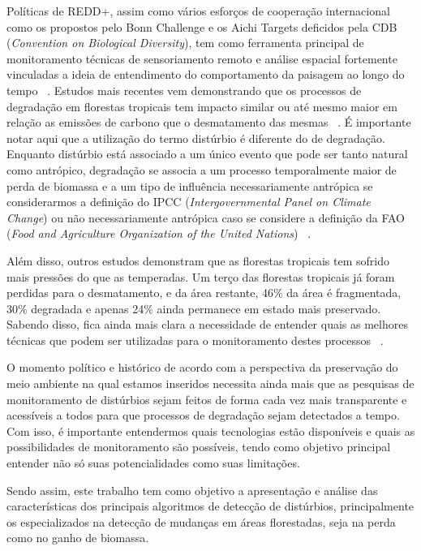 \documentclass{article}
\begin{document}
Políticas de REDD+, assim como vários esforços de cooperação internacional como os propostos pelo Bonn Challenge e os Aichi Targets deficidos pela CDB (\textit{Convention on Biological Diversity}), tem como ferramenta principal de monitoramento técnicas de sensoriamento remoto e análise espacial fortemente vinculadas a ideia de entendimento do comportamento da paisagem ao longo do tempo ~\cite{BOS2019295, CROUZEILLES2019}. Estudos mais recentes vem demonstrando que os processos de degradação em florestas tropicais tem impacto similar ou até mesmo maior em relação as emissões de carbono que o desmatamento das mesmas ~\cite{Harris1573, Houghton2012, Grace2014}. É importante notar aqui que a utilização do termo distúrbio é diferente do de degradação. Enquanto distúrbio está associado a um único evento que pode ser tanto natural como antrópico, degradação se associa a um processo temporalmente maior de perda de biomassa e a um tipo de influência necessariamente antrópica se considerarmos a definição do IPCC (\textit{Intergovernmental Panel on Climate Change}) ou não necessariamente antrópica caso se considere a definição da FAO (\textit{Food and Agriculture Organization of the United Nations}) ~\cite{Hirschmugl2017}. 
\par
Além disso, outros estudos demonstram que as florestas tropicais tem sofrido mais pressões do que as temperadas. Um terço das florestas tropicais já foram perdidas para o desmatamento, e da área restante, 46\% da área é fragmentada, 30\% degradada e apenas 24\% ainda permanece em estado mais preservado. Sabendo disso, fica ainda mais clara a necessidade de entender quais as melhores técnicas que podem ser utilizadas para o monitoramento destes processos ~\cite{Hirschmugl2017}. 
\par
O momento político e histórico de acordo com a perspectiva da preservação do meio ambiente na qual estamos inseridos necessita ainda mais que as pesquisas de monitoramento de distúrbios sejam feitos de forma cada vez mais transparente e acessíveis a todos para que processos de degradação sejam detectados a tempo. Com isso, é importante entendermos quais tecnologias estão disponíveis e quais as possibilidades de monitoramento são possíveis, tendo como objetivo principal entender não só suas potencialidades como suas limitações. 
\par
Sendo assim, este trabalho tem como objetivo a apresentação e análise das características dos principais algoritmos de detecção de distúrbios, principalmente os especializados na detecção de mudanças em áreas florestadas, seja na perda como no ganho de biomassa.
\par
\end{document}
